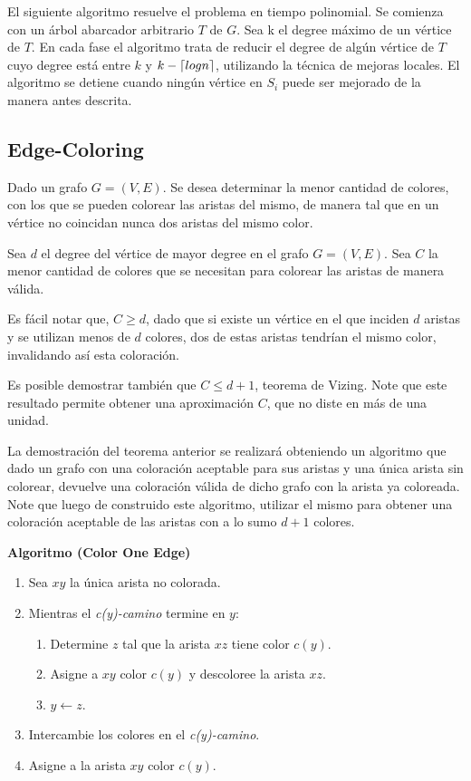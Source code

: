 \documentclass[../np-approximations.tex]{subfiles}
\begin{document}
El siguiente algoritmo resuelve el problema en tiempo polinomial.
Se comienza con un árbol abarcador arbitrario $T$ de $G$. Sea k el 
degree máximo de un vértice de $T$. En cada fase el algoritmo trata 
de reducir el degree de algún vértice de $T$ cuyo degree está entre 
$k$ y $k-\left \lceil log n \right \rceil$, utilizando la técnica de mejoras locales. 
El algoritmo se detiene cuando ningún vértice en $S_i$ puede ser 
mejorado de la manera antes descrita.

\subsection{Edge-Coloring}

\begin{statement}
	Dado un grafo $G=(V,E)$. Se desea determinar la menor cantidad de
	colores, con los que se pueden colorear las aristas del mismo, de 
	manera tal que en un vértice no coincidan nunca dos aristas del
	mismo color.
\end{statement}

Sea $d$ el degree del vértice de mayor degree en el grafo $G=(V,E)$.
Sea $C$ la menor cantidad de colores que se necesitan para colorear 
las aristas de manera válida.

Es fácil notar que, $C \ge d$, dado que si existe un vértice en el 
que inciden $d$ aristas y se utilizan menos de $d$ colores, dos de 
estas aristas tendrían el mismo color, invalidando así esta 
coloración.

Es posible demostrar también que $C \le d+1$, teorema de Vizing. 
Note que este resultado permite obtener una aproximación $C$, que 
no diste en más de una unidad.

La demostración del teorema anterior se realizará obteniendo un algoritmo
que dado un grafo con una coloración aceptable para sus aristas y una única
arista sin colorear, devuelve una coloración válida de dicho grafo con la
arista ya coloreada. Note que luego de construido este algoritmo, utilizar
el mismo para obtener una coloración aceptable de las aristas con a lo sumo
$d+1$ colores.

\bigskip
\begin{tcolorbox}
	\textbf{Algoritmo (Color One Edge)}
	\begin{enumerate}
		\item Sea $xy$ la única arista no colorada.
		\item Mientras el \emph{c(y)-camino} termine en $y$:
		      \begin{enumerate}
		      	\item Determine $z$ tal que la arista $xz$ tiene color $c(y)$.
		      	\item Asigne a $xy$ color $c(y)$ y descoloree la arista $xz$.
		      	\item $y \leftarrow z$.
		      \end{enumerate}
		\item Intercambie los colores en el \emph{c(y)-camino}.
		\item Asigne a la arista $xy$ color $c(y)$.
	\end{enumerate}
\end{tcolorbox}
\bigskip
\end{document}
